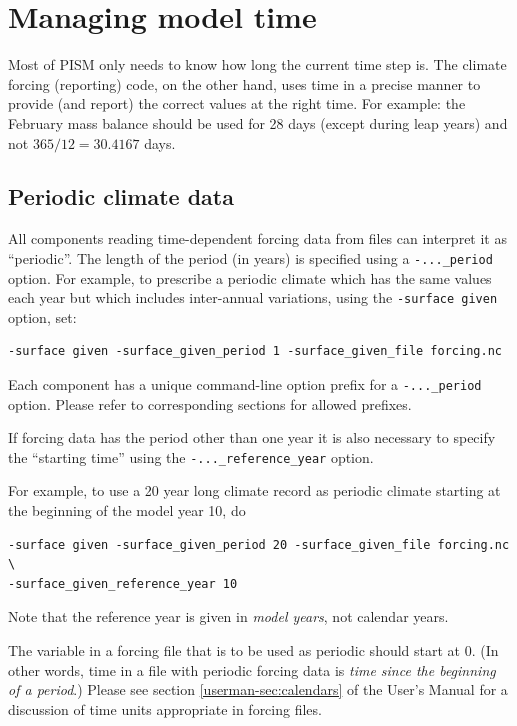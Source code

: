 \documentclass[titlepage,letterpaper,final]{scrartcl}
\begin{document}
\newpage
\section{Managing model time}
\label{sec:model-time}

Most of PISM only needs to know how long the current time step is. The
climate forcing (reporting) code, on the other hand, uses time in a
precise manner to provide (and report) the correct values at the right
time. For example: the February mass balance should be used for 28
days (except during leap years) and not $365/12 = 30.4167$ days.




\subsection{Periodic climate data}
\label{sec:periodic-forcing}

All components reading time-dependent forcing data from files can interpret
it as ``periodic''.  The length of the period (in years) is specified using
a \texttt{-..._period} option.  For example, to prescribe a periodic climate
which has the same values each year but which includes
inter-annual variations, using the \texttt{-surface given} option, set:
\begin{verbatim}
-surface given -surface_given_period 1 -surface_given_file forcing.nc
\end{verbatim}

Each component has a unique command-line option prefix for a
\texttt{-..._period} option. Please refer to corresponding sections for
allowed prefixes.

If forcing data has the period other than one year it is also
necessary to specify the ``starting time'' using the
\texttt{-..._reference_year} option.

For example, to use a 20 year long climate record as periodic climate starting
at the beginning of the model year 10, do
\begin{verbatim}
-surface given -surface_given_period 20 -surface_given_file forcing.nc \
-surface_given_reference_year 10
\end{verbatim}

Note that the reference year is given in \emph{model years}, not calendar
years.

The  variable  in a forcing file that is to  be used as periodic
should start at $0$. (In other words, time in a file with periodic forcing data
is  \emph{time  since   the  beginning  of  a  period}.)   Please  see  section
\ref*{userman-sec:calendars}  of the User's Manual for a  discussion  of time  units  appropriate in  forcing
files.
\end{document}
